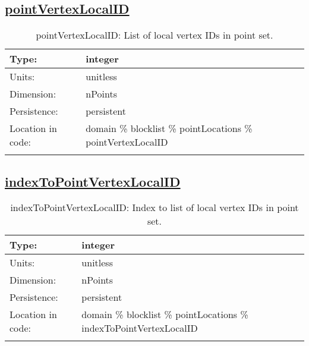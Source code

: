 \subsection[pointVertexLocalID]{\hyperref[sec:var_tab_pointLocations]{pointVertexLocalID}}
\label{subsec:var_sec_pointLocations_pointVertexLocalID}
\begin{center}
\begin{longtable}{| p{2.0in} | p{4.0in} |}
        \hline 
        Type: & integer \\
        \hline 
        Units: & \si{unitless} \\
        \hline 
        Dimension: & nPoints \\
        \hline 
        Persistence: & persistent \\
        \hline 
         Location in code: & domain \% blocklist \% pointLocations \% pointVertexLocalID \\
         \hline 
    \caption{pointVertexLocalID: List of local vertex IDs in point set.}
\end{longtable}
\end{center}
\subsection[indexToPointVertexLocalID]{\hyperref[sec:var_tab_pointLocations]{indexToPointVertexLocalID}}
\label{subsec:var_sec_pointLocations_indexToPointVertexLocalID}
\begin{center}
\begin{longtable}{| p{2.0in} | p{4.0in} |}
        \hline 
        Type: & integer \\
        \hline 
        Units: & \si{unitless} \\
        \hline 
        Dimension: & nPoints \\
        \hline 
        Persistence: & persistent \\
        \hline 
         Location in code: & domain \% blocklist \% pointLocations \% indexToPointVertexLocalID \\
         \hline 
    \caption{indexToPointVertexLocalID: Index to list of local vertex IDs in point set.}
\end{longtable}
\end{center}
